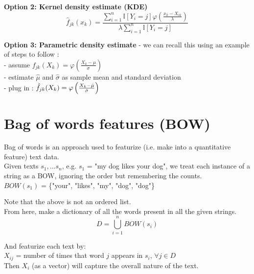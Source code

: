 \documentclass[11pt]{report}
\begin{document}
\textbf{Option 2: Kernel density estimate (KDE)}
\[\hat{f}_{jk}(x_k)=\frac{\sum\limits_{i=1}^n \mathbb{I}\left[Y_i=j\right] \varphi \left(\frac{x_k - X_{ik}}{\lambda}\right)}{\lambda \sum\limits_{i=1}^n \mathbb{I}\left[Y_i=j\right]}\]

\textbf{Option 3: Parametric density estimate} - we can recall this using an example of steps to follow :\\

- assume ${f}_{jk}(X_k)=\varphi \left(\frac{X_k - \mu}{\sigma}\right)$ \\

- estimate $\hat{\mu}$ and $\hat{\sigma}$ as sample mean and standard deviation\\

- plug in : $\Hat{f}_{jk}(X_k)=\varphi \left(\frac{X_k - \hat{\mu}}{\hat{\sigma}}\right)$



\newpage
\section{Bag of words features (BOW)}

Bag of words is an approach used to featurize (i.e. make into a quantitative feature) text data. \\

Given texts $s_1,...s_n$, e.g. $s_1$ = "my dog likes your dog", we treat each instance of a string as a BOW, ignoring the order but remembering the counts. \\

$BOW(s_1)$ = \{"your", "likes", "my", "dog", "dog"\}

Note that the above is not an ordered list. \\

From here, make a dictionary of all the words present in all the given strings. \\

$$
D = \bigcup\limits_{i=1}^n BOW(s_i)
$$

And featurize each text by: \\

$X_{ij}$ = number of times that word $j$ appears in $s_i$, $\forall j \in D$ \\

Then $X_i$ (as a vector) will capture the overall nature of the text. \\
\end{document}
